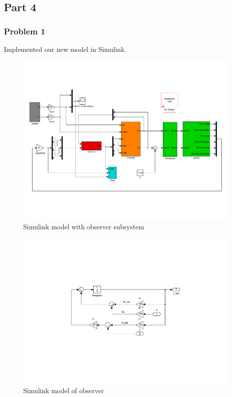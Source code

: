 \subsection{Part 4}


\subsubsection{Problem 1}
Implemented our new model in Simulink. 
\begin{figure}[h!]
    \centering
	\includegraphics[trim={0 3cm 0 3cm},clip,width=\linewidth]{images/simulink/P4_diag.pdf}
    \caption{Simulink model with observer subsystem}
    \label{fig:simulink_P4}
\end{figure}

\begin{figure}[H]
    \centering
	\includegraphics[trim={6.5cm 6.5cm 6.5cm 6.5cm},clip,width=\linewidth]{images/simulink/P4_observer.pdf}
    \caption{Simulink model of observer}
    \label{fig:simulink_P4_observer}
\end{figure}

